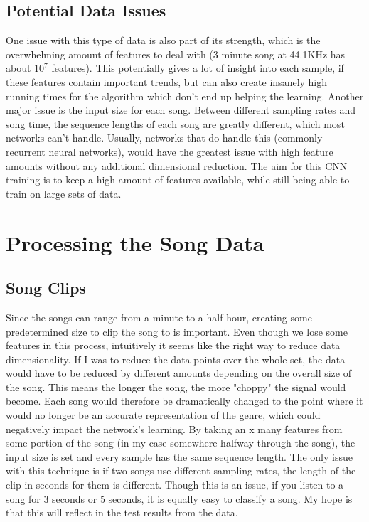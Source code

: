 \documentclass{article}
\begin{document}
\subsection{Potential Data Issues}
One issue with this type of data is also part of its strength, which is the overwhelming amount of features to deal with (3 minute song at 44.1KHz has about $10^{7}$ features). This potentially gives a lot of insight into each sample, if these features contain important trends, but can also create insanely high running times for the algorithm which don't end up helping the learning. Another major issue is the input size for each song. Between different sampling rates and song time, the sequence lengths of each song are greatly different, which most networks can't handle. Usually, networks that do handle this (commonly recurrent neural networks), would have the greatest issue with high feature amounts without any additional dimensional reduction. The aim for this CNN training is to keep a high amount of features available, while still being able to train on large sets of data.
\section{Processing the Song Data}
\subsection{Song Clips}
Since the songs can range from a minute to a half hour, creating some predetermined size to clip the song to is important. Even though we lose some features in this process, intuitively it seems like the right way to reduce data dimensionality. If I was to reduce the data points over the whole set, the data would have to be reduced by different amounts depending on the overall size of the song. This means the longer the song, the more "choppy" the signal would become. Each song would therefore be dramatically changed to the point where it would no longer be an accurate representation of the genre, which could negatively impact the network's learning. By taking an x many features from some portion of the song (in my case somewhere halfway through the song), the input size is set and every sample has the same sequence length. The only issue with this technique is if two songs use different sampling rates, the length of the clip in seconds for them is different. Though this is an issue, if you listen to a song for 3 seconds or 5 seconds, it is equally easy to classify a song. My hope is that this will reflect in the test results from the data. 
\end{document}
